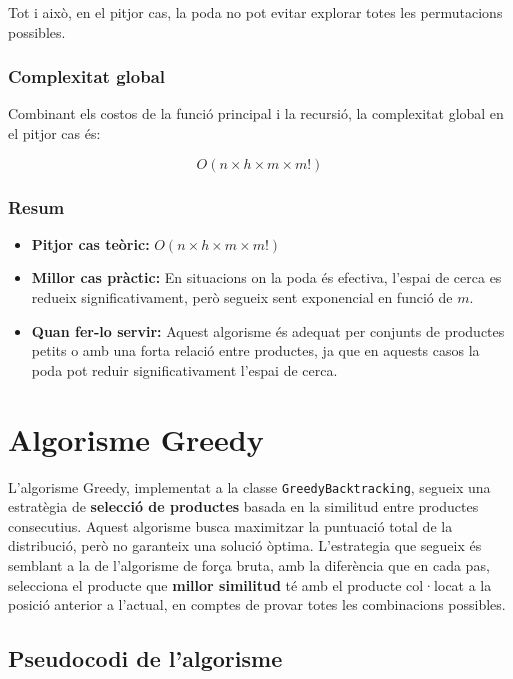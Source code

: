 \documentclass[a4paper,12pt]{report}
\begin{document}
Tot i això, en el pitjor cas, la poda no pot evitar explorar totes les permutacions possibles.

\subsubsection{Complexitat global}

Combinant els costos de la funció principal i la recursió, la complexitat global en el pitjor cas és:

\[
O(n \times h \times m \times m!)
\]

\subsubsection{Resum}

\begin{itemize}
    \item \textbf{Pitjor cas teòric:} \(O(n \times h \times m \times m!)\)
    \item \textbf{Millor cas pràctic:} En situacions on la poda és efectiva, l'espai de cerca es redueix significativament, però segueix sent exponencial en funció de \(m\).
    \item \textbf{Quan fer-lo servir:} Aquest algorisme és adequat per conjunts de productes petits o amb una forta relació entre productes, ja que en aquests casos la poda pot reduir significativament l'espai de cerca.
\end{itemize}


\section{Algorisme Greedy}

L'algorisme Greedy, implementat a la classe \texttt{GreedyBacktracking}, segueix una estratègia de \textbf{selecció de productes} basada en la similitud entre productes consecutius. Aquest algorisme busca maximitzar la puntuació total de la distribució, però no garanteix una solució òptima.
\newline
L'estrategia que segueix és semblant a la de l'algorisme de força bruta, amb la diferència que en cada pas, selecciona el producte que \textbf{millor similitud} té amb el producte col·locat a la posició anterior a l'actual, en comptes de provar totes les combinacions possibles.

\subsection{Pseudocodi de l'algorisme}
\end{document}
